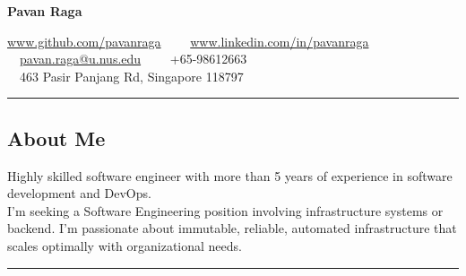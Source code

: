 \documentclass[10pt,letterpaper]{article}
\begin{document}
\begin{center}
{\huge \textbf{Pavan Raga}}


\href{https://github.com/pavanraga}{www.github.com/pavanraga}\ \ \textbullet
\ \ \href{https://www.linkedin.com/in/pavanraga/}{www.linkedin.com/in/pavanraga}\ \ \textbullet
\ \ \href{mailto:pavan.raga98@gmail.com}{pavan.raga@u.nus.edu}\ \ \textbullet
\ \ {+65-98612663} \\
\ \ {463 Pasir Panjang Rd, Singapore 118797}

\end{center}

\hrule
\vspace{-1.0em}
\subsection*{About Me}
\noindent Highly skilled software engineer with more than 5 years of experience in software development and DevOps.\\ I'm seeking a Software Engineering position involving infrastructure systems or backend. I'm passionate about immutable, reliable, automated infrastructure that scales optimally with organizational needs.
\\

\hrule
\vspace{-1.0em}
\end{document}

